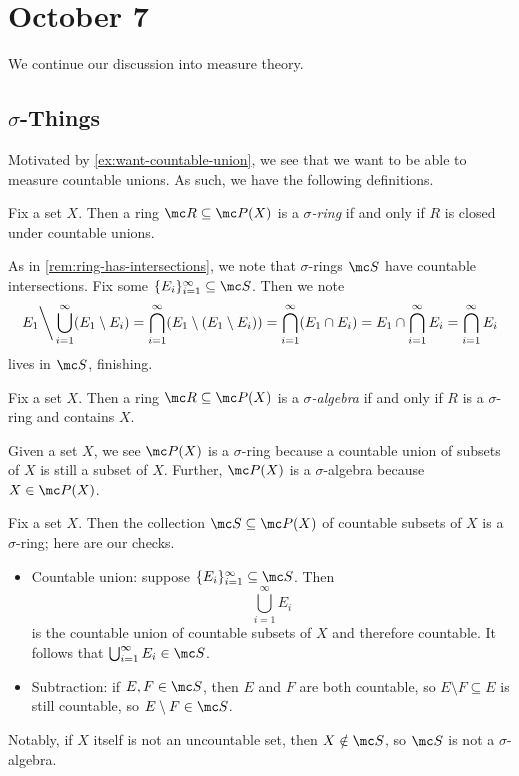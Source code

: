 \documentclass[../notes.tex]{subfiles}
\begin{document}
\section{October 7}

We continue our discussion into measure theory.

\subsection{\texorpdfstring{$\sigma$}{ Sigma}-Things}
Motivated by \autoref{ex:want-countable-union}, we see that we want to be able to measure countable unions. As such, we have the following definitions.
\begin{defihelper} 
	Fix a set $X$. Then a ring $\mc R\subseteq\mc P(X)$ is a \textit{$\sigma$-ring} if and only if $R$ is closed under countable unions.
\end{defihelper}
\begin{remark} \label{rem:sring-has-intersections}
	As in \autoref{rem:ring-has-intersections}, we note that $\sigma$-rings $\mc S$ have countable intersections. Fix some $\{E_i\}_{i=1}^\infty\subseteq\mc S$. Then we note
	\[E_1{\mathbin\bigg\backslash}\bigcup_{i=1}^\infty(E_1\setminus E_i)=\bigcap_{i=1}^\infty(E_1\setminus(E_1\setminus E_i))=\bigcap_{i=1}^\infty(E_1\cap E_i)=E_1\cap\bigcap_{i=1}^\infty E_i=\bigcap_{i=1}^\infty E_i\]
	lives in $\mc S$, finishing.
\end{remark}
\begin{defihelper} 
	Fix a set $X$. Then a ring $\mc R\subseteq\mc P(X)$ is a \textit{$\sigma$-algebra} if and only if $R$ is a $\sigma$-ring and contains $X$.
\end{defihelper}
\begin{ex}
	Given a set $X$, we see $\mc P(X)$ is a $\sigma$-ring because a countable union of subsets of $X$ is still a subset of $X$. Further, $\mc P(X)$ is a $\sigma$-algebra because $X\in\mc P(X)$.
\end{ex}
\begin{example} \label{ex:countable-sigma-ring}
	Fix a set $X$. Then the collection $\mc S\subseteq\mc P(X)$ of countable subsets of $X$ is a $\sigma$-ring; here are our checks.
	\begin{itemize}
		\item Countable union: suppose $\{E_i\}_{i=1}^\infty\subseteq\mc S$. Then
		\[\bigcup_{i=1}^\infty E_i\]
		is the countable union of countable subsets of $X$ and therefore countable. It follows that $\bigcup_{i=1}^\infty E_i\in\mc S$.
		\item Subtraction: if $E,F\in\mc S$, then $E$ and $F$ are both countable, so $E\setminus F\subseteq E$ is still countable, so $E\setminus F\in\mc S$.
	\end{itemize}
	Notably, if $X$ itself is not an uncountable set, then $X\notin\mc S$, so $\mc S$ is not a $\sigma$-algebra.
\end{example}
\end{document}
